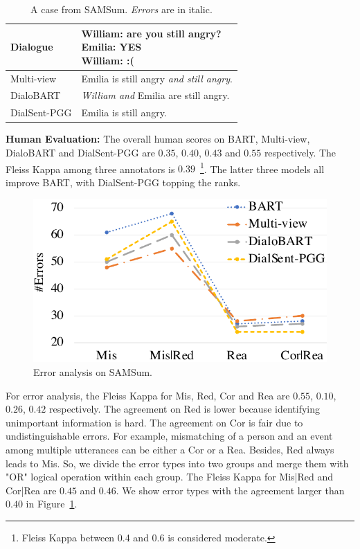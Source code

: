 \begin{table}[th]
	\scriptsize
	\centering
	\begin{tabular}{lp{4.8cm}}
		\toprule[1pt]
		 {Dialogue}& \makecell[l]{William: are you still angry? \\Emilia: YES  \\William: :(} \\
		 \hline
		 {Multi-view}& Emilia is still angry \textit{and still angry}. \\
		 \hline
		 {DialoBART}& \textit{William and} Emilia are still angry.\\
		 \hline
		 {DialSent-PGG} &Emilia is still angry. \\
		\bottomrule[1pt]
	\end{tabular}
	\caption{A case from SAMSum. \textit{Errors} are in italic.}
	\label{tab:case}
\end{table}



\textbf{Human Evaluation:} The overall human scores on BART, Multi-view, DialoBART and DialSent-PGG are $0.35$, $0.40$, $0.43$ and $0.55$ respectively. 
The Fleiss Kappa among three annotators is $0.39$~\footnote{Fleiss Kappa between 0.4 and 0.6 is considered moderate.}.
The latter three models all improve BART, 
with DialSent-PGG topping the ranks.

\begin{figure}[th]
	\centering
	\includegraphics[scale=0.4]{humaneval.pdf}
	\caption{Error analysis on SAMSum. }
	\label{fig:humaneval}
\end{figure}
For error analysis, the Fleiss Kappa for Mis, Red, Cor and Rea are 
$0.55$, $0.10$, $0.26$, $0.42$ respectively. The agreement on Red is 
lower because identifying unimportant information is hard. 
The agreement on Cor is fair due to undistinguishable errors. For example, mismatching of a person and an event among multiple utterances can be either a Cor or a Rea. Besides, Red always leads to Mis. So, 
we divide the error types into two groups and merge them with "OR" logical operation within each group. The Fleiss Kappa for Mis|Red and Cor|Rea are $0.45$ and $0.46$.
We show error types with the agreement larger than $0.40$ in Figure~\ref{fig:humaneval}. 

